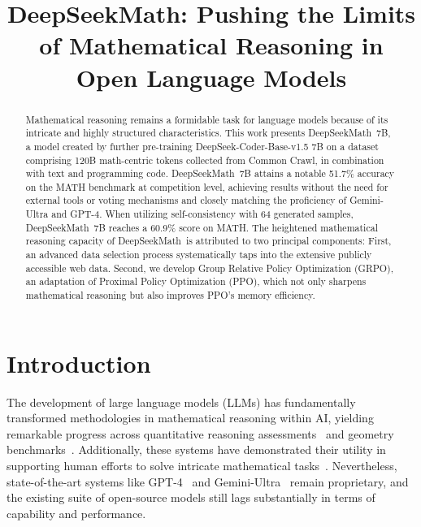 \title{DeepSeekMath: Pushing the Limits of Mathematical Reasoning in Open Language Models}

\begin{abstract}
Mathematical reasoning remains a formidable task for language models because of its intricate and highly structured characteristics. This work presents DeepSeekMath~7B, a model created by further pre-training DeepSeek-Coder-Base-v1.5 7B on a dataset comprising 120B math-centric tokens collected from Common Crawl, in combination with text and programming code. DeepSeekMath~7B attains a notable 51.7\% accuracy on the MATH benchmark at competition level, achieving results without the need for external tools or voting mechanisms and closely matching the proficiency of Gemini-Ultra and GPT-4. When utilizing self-consistency with 64 generated samples, DeepSeekMath~7B reaches a 60.9\% score on MATH. The heightened mathematical reasoning capacity of DeepSeekMath~is attributed to two principal components: First, an advanced data selection process systematically taps into the extensive publicly accessible web data. Second, we develop Group Relative Policy Optimization (GRPO), an adaptation of Proximal Policy Optimization (PPO), which not only sharpens mathematical reasoning but also improves PPO’s memory efficiency.
\end{abstract}

\section{Introduction}

The development of large language models (LLMs) has fundamentally transformed methodologies in mathematical reasoning within AI, yielding remarkable progress across quantitative reasoning assessments~\citep{MATH} and geometry benchmarks~\citep{trinh2024solving}. Additionally, these systems have demonstrated their utility in supporting human efforts to solve intricate mathematical tasks~\citep{tao}. Nevertheless, state-of-the-art systems like GPT-4~\citep{gpt4} and Gemini-Ultra~\citep{gemini} remain proprietary, and the existing suite of open-source models still lags substantially in terms of capability and performance.

